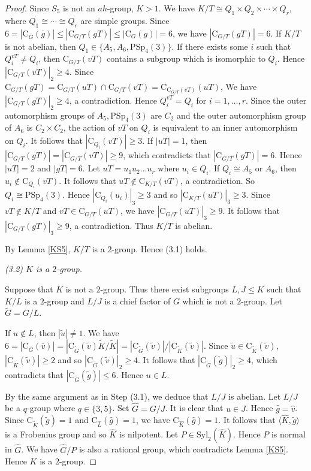 \documentclass[11pt]{article}
\providecommand{\Syl}{{\mathrm{Syl}}}
\providecommand{\PSp}{{\mathrm{PSp}}}
\providecommand{\C}{{\mathrm{C}}}
\providecommand{\gen}[1]{\langle #1 \rangle} %
\providecommand{\gen}[1]{\langle #1 \rangle} %
\providecommand{\gen}[1]{\langle #1 \rangle} %
\providecommand{\olG}{{\overline{G}}}
\providecommand{\wtg}{{\widetilde{g}}}
\providecommand{\wtu}{{\widetilde{u}}}
\providecommand{\wtv}{{\widetilde{v}}}
\providecommand{\wtG}{{\widetilde{G}}}
\providecommand{\wtK}{{\widetilde{K}}}
\providecommand{\whg}{{\widehat{g}}}
\providecommand{\whv}{{\widehat{v}}}
\providecommand{\whG}{{\widehat{G}}}
\providecommand{\whK}{{\widehat{K}}}
\providecommand{\whL}{{\widehat{L}}}
\begin{document}
\begin{proof}
    Since $S_5$ is not an $ah$-group, $K>1$.
    We have $K/T \cong Q_1\times Q_2 \times \cdots \times Q_r$,
    where $Q_1\cong \cdots \cong Q_r$ are simple groups.
    Since $6 = |\C_{\overline{G}}(\overline{g})|\leq |\C_{G/T}(gT)| \leq |\C_G(g)|=6$,
    we have $|\C_{G/T}(gT)| = 6$.
    If $K/T$ is not abelian, then $Q_1\in \{A_5, A_6, \PSp_4(3)\}$.
    If there exists some $i$ such that $Q_i^{vT}\neq Q_i$, 
    then $\C_{G/T}(vT)$ contains a subgroup which is isomorphic to $Q_i$.
    Hence $|\C_{G/T}(vT)|_2 \geq 4$.
    Since $\C_{G/T}(gT)=\C_{G/T}(uT)\cap \C_{G/T}(vT) = \C_{\C_{G/T}(vT)}(uT)$,
    We have $|\C_{G/T}(gT)|_2\geq 4$, a contradiction.
    Hence $Q_i^{vT} = Q_i$ for $i=1,\ldots,r$.
    Since the outer automorphism groups of $A_5, \PSp_4(3)$ are $C_2$
    and the outer automorphism group of $A_6$ is $C_2\times C_2$, 
    the action of $vT$ on $Q_i$ is equivalent to an inner automorphism on $Q_i$.
    It follows that $|\C_{Q_i}(vT)|\geq 3$.
    If $|uT|=1$, then $|\C_{G/T}(gT)|=|\C_{G/T}(vT)|\geq 9$, 
    which contradicts that $|\C_{G/T}(gT)|=6$.
    Hence $|uT|=2$ and $|gT|=6$.
    Let $uT = u_1 u_2 \ldots u_r$ where $u_i\in Q_i$.
    If $Q_i \cong A_5$ or $A_6$, then $u_i \notin \C_{Q_i}(vT)$.
    It follows that $uT\notin \C_{K/T}(vT)$, a contradiction.
    So $Q_i \cong \PSp_4(3)$.
    Hence $|\C_{Q_i}(u_i)|_3\geq 3$ and so $|\C_{K/T}(uT)|_3\geq 3$.
    Since $vT\notin K/T$ and $vT\in \C_{G/T}(uT)$, 
    we have $|\C_{G/T}(uT)|_3 \geq 9$.
    It follows that $|\C_{G/T}(gT)|_3 \geq 9$, a contradiction.
    Thus $K/T$ is abelian.

    By Lemma \ref{KS5}, $K/T$ is a $2$-group. Hence (3.1) holds.

\medskip
{\sl (3.2) $K$ is a $2$-group.}

    Suppose that $K$ is not a $2$-group.
    Thus there exist subgroups $L,J\leq K$ such that $K/L$ is a $2$-group
    and $L/J$ is a chief factor of $G$ which is not a $2$-group.
    Let $\wtG=G/L$. 
    
    If $u\notin L$, then $|\wtu| \neq 1$.
    We have 
    $6 = |\C_{\olG}(\overline{v})|=|\C_{\wtG}(\wtv)\wtK / \wtK|
    = |\C_{\wtG}(\wtv)|/|\C_{\wtK}(\wtv)|$.
    Since $\wtu \in \C_{\wtK}(\wtv)$, 
    $|\C_{\wtK}(\wtv)|\geq 2$ and so $|\C_{\wtG}(\wtv)|_2\geq 4$.
    It follows that $|\C_{\wtG}(\wtg)|_2 \geq 4$, 
    which contradicts that $|\C_{\wtG}(\wtg)|\leq 6$.
    Hence $u\in L$.
    
    By the same argument as in Step (3.1), we deduce that $L/J$ is abelian.
    Let $L/J$ be a $q$-group where $q\in \{3,5\}$.
    Set $\whG=G/J$. 
    It is clear that $u\in J$.
    Hence $\whg=\whv$.
	    Since $\C_{\wtK}(\wtg)=1$ and $\C_{\whL}(\whg)=1$,
    we have $\C_{\whK}(\whg)=1$.
    It follows that $\gen{\whK, \wtg}$ is a Frobenius group and so $\whK$ is nilpotent.
    Let $P\in \Syl _2(\whK)$.
    Hence $P$ is normal in $\whG$.
    We have $\whG/P$ is also a rational group, which contradicts Lemma \ref{KS5}.
    Hence $K$ is a $2$-group.


\end{proof}
\end{document}
